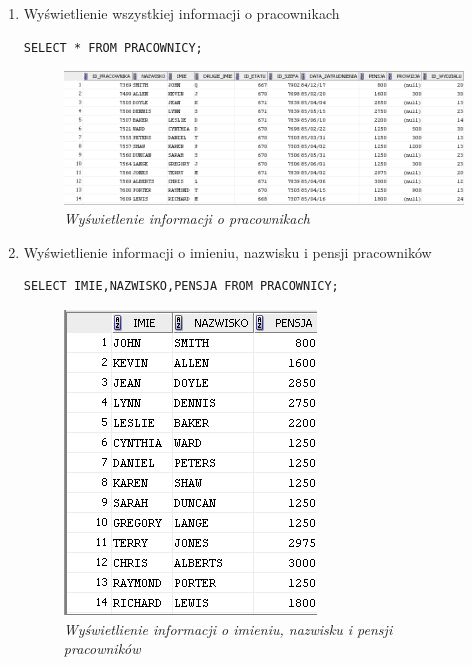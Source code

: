 \documentclass[a4paper, 10pt]{article}
\begin{document}
\begin{enumerate}

\item Wyświetlienie wszystkiej informacji o pracownikach
\begin{lstlisting}[style=SQL, caption=\textit{Wyświetlenie informacji o pracownikach}]
SELECT * FROM PRACOWNICY;
\end{lstlisting}

\begin{figure}[H]
	\centering
	\includegraphics[scale=0.7]{zadanie1.png}
	\caption{\textit{Wyświetlenie informacji o pracownikach}}
	\label{fig:wszystko}
\end{figure}

\item Wyświetlienie informacji o imieniu, nazwisku i pensji pracowników
\begin{lstlisting}[style=SQL, caption=\textit{Wyświetlienie informacji o imieniu, nazwisku i pensji pracowników}]
SELECT IMIE,NAZWISKO,PENSJA FROM PRACOWNICY;
\end{lstlisting}

\begin{figure}[H]
	\centering
	\includegraphics[scale=0.7]{zadanie2.png}
	\caption{\textit{Wyświetlienie informacji o imieniu, nazwisku i pensji pracowników}}
	\label{fig:imie_nazwisko_pensja}
\end{figure}


\end{enumerate}
\end{document}
